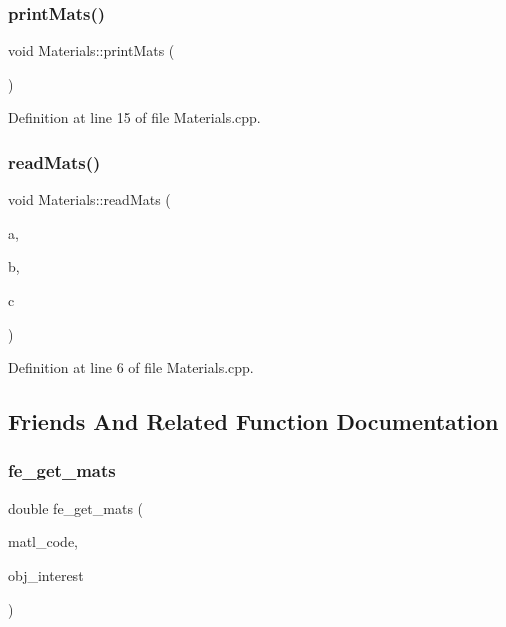 \subsubsection{\texorpdfstring{print\+Mats()}{printMats()}}
{\footnotesize\ttfamily void Materials\+::print\+Mats (\begin{DoxyParamCaption}{ }\end{DoxyParamCaption})}



Definition at line 15 of file Materials.\+cpp.

\mbox{\label{class_materials_a06e59a5742730b2292d39b7488523505}} 
\subsubsection{\texorpdfstring{read\+Mats()}{readMats()}}
{\footnotesize\ttfamily void Materials\+::read\+Mats (\begin{DoxyParamCaption}\item[{int}]{a,  }\item[{std\+::string}]{b,  }\item[{Vector\+Xd}]{c }\end{DoxyParamCaption})}



Definition at line 6 of file Materials.\+cpp.



\subsection{Friends And Related Function Documentation}
\mbox{\label{class_materials_af7ffbad6dfcc99fc88b130c1a7b1720a}} 
\subsubsection{\texorpdfstring{fe\+\_\+get\+\_\+mats}{fe\_get\_mats}}
{\footnotesize\ttfamily double fe\+\_\+get\+\_\+mats (\begin{DoxyParamCaption}\item[{int}]{matl\+\_\+code,  }\item[{int}]{obj\+\_\+interest }\end{DoxyParamCaption})\hspace{0.3cm}{\ttfamily [friend]}}

